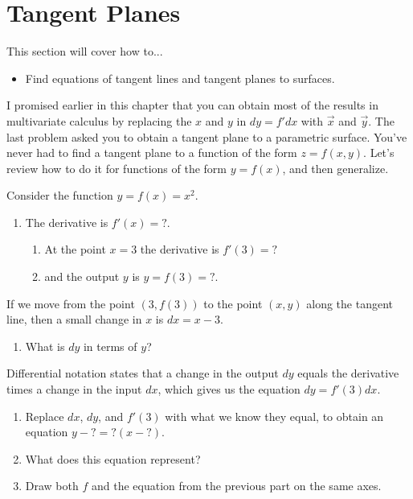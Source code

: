 
\normalsize


\section{Tangent Planes}
This section will cover how to...
\begin{itemize} 
\item Find equations of tangent lines and tangent planes to surfaces. 
\end{itemize}


I promised earlier in this chapter that you can obtain most of the results in multivariate calculus by replacing the $x$ and $y$ in $dy=f'dx$ with $\vec x$ and $\vec y$. The last problem asked you to obtain a tangent plane to a parametric surface. You've never had to find a tangent plane to a function of the form $z=f(x,y)$.  Let's review how to do it for functions of the form $y=f(x)$, and then generalize. 

\begin{problem}\label{prob:tangent line1}
 Consider the function $y=f(x)=x^2$.  
\begin{enumerate}
 \item The derivative is $f'(x) = ?$. 
	\begin{enumerate} 
		\item At the point $x=3$ the derivative is $f'(3)=?$ 
		\item and the output $y$ is $y=f(3)=?$.
	\end{enumerate}
\end{enumerate}
If we move from the point $(3,f(3))$ to the point $(x,y)$ along the tangent line, then a small change in $x$ is $dx=x-3$. 
\begin{enumerate}[resume]
	\item What is $dy$ in terms of $y$?
\end{enumerate}
Differential notation states that a change in the output $dy$ equals the derivative times a change in the input $dx$, which gives us the equation $dy=f'(3)dx$. 
\begin{enumerate}[resume]
	\item Replace $dx$, $dy$, and $f'(3)$ with what we know they equal, to obtain an equation $y-?=?(x-?)$. 
	\item What does this equation represent?
	\item Draw both $f$ and the equation from the previous part on the same axes.   
\end{enumerate}
\end{problem}

